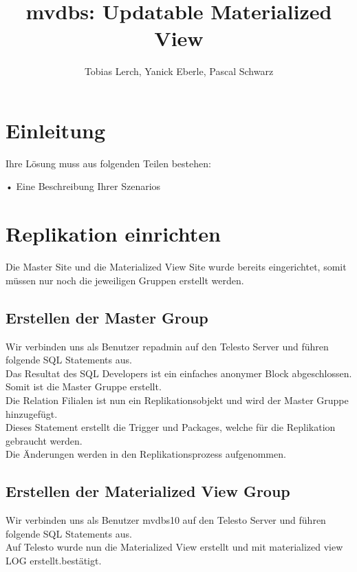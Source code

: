 \documentclass[11pt,a4paper,parskip=half]{scrartcl}
\title{mvdbs: Updatable Materialized View}
\author{Tobias Lerch, Yanick Eberle, Pascal Schwarz}
\begin{document}
\maketitle

\section{Einleitung}
Ihre Lösung muss aus folgenden Teilen bestehen:

• Eine Beschreibung Ihrer Szenarios


\section{Replikation einrichten}
Die Master Site und die Materialized View Site wurde bereits eingerichtet, somit müssen nur noch die jeweiligen Gruppen erstellt werden.
\subsection{Erstellen der Master Group}
Wir verbinden uns als Benutzer repadmin auf den Telesto Server und führen folgende SQL Statements aus.\\

 
Das Resultat des SQL Developers ist ein einfaches  \glqq anonymer Block abgeschlossen\grqq. Somit ist die Master Gruppe erstellt.\\


Die Relation Filialen ist nun ein Replikationsobjekt  und wird der Master Gruppe hinzugefügt. \\


Dieses Statement erstellt die Trigger und Packages, welche für die Replikation gebraucht werden.\\


Die Änderungen werden in den Replikationsprozess aufgenommen.\\

\subsection{Erstellen der Materialized View Group}
Wir verbinden uns als Benutzer mvdbs10 auf den Telesto Server und führen folgende SQL Statements aus.\\


Auf Telesto wurde nun die Materialized View erstellt und mit \glqq materialized view LOG erstellt.\grqq bestätigt.\\
\end{document}
